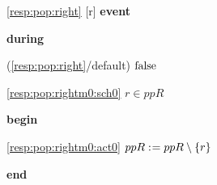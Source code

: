 \noindent \ref{resp:pop:right} [r] \textbf{event}
\begin{block}
  \item   \textbf{during}
  \begin{block}
  \item[ (\ref{resp:pop:right}/default) ]\sout{$\text{false} $} %
  \end{block}
  \begin{block}
  \item[ \eqref{resp:pop:rightm0:sch0} ]{$r \in ppR $} %
  \end{block}
  \item   \textbf{begin}
  \begin{block}
  \item[ \eqref{resp:pop:rightm0:act0} ]{$ppR \mathrel{:\mkern1mu=} ppR \setminus \{ r \} $} %
  \end{block}
  \item   \textbf{end} \\
\end{block}

